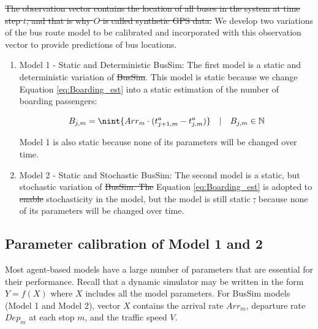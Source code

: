 \documentclass[11pt]{article}
\DeclarePairedDelimiter{\nint}\lfloor\rceil
\providecommand{\DIFaddtex}[1]{{\protect\color{blue}\uwave{#1}}} %
\providecommand{\DIFdeltex}[1]{{\protect\color{red}\sout{#1}}}                      %
\providecommand{\DIFaddbegin}{} %
\providecommand{\DIFaddend}{} %
\providecommand{\DIFdelbegin}{} %
\providecommand{\DIFdelend}{} %
\providecommand{\DIFadd}[1]{\texorpdfstring{\DIFaddtex{#1}}{#1}} %
\providecommand{\DIFdel}[1]{\texorpdfstring{\DIFdeltex{#1}}{}} %
\newcommand{\DIFscaledelfig}{0.5}
\newlength{\DIFdelgraphicswidth} %
\newlength{\DIFdelgraphicsheight} %
\newcommand{\DIFaddincludegraphics}[2][]{{\color{blue}\fbox{\DIFOincludegraphics[#1]{#2}}}} %
\newcommand{\DIFdelincludegraphics}[2][]{%
\sbox{\DIFdelgraphicsbox}{\DIFOincludegraphics[#1]{#2}}%
\settoboxwidth{\DIFdelgraphicswidth}{\DIFdelgraphicsbox} %
\settoboxtotalheight{\DIFdelgraphicsheight}{\DIFdelgraphicsbox} %
\scalebox{\DIFscaledelfig}{%
\parbox[b]{\DIFdelgraphicswidth}{\usebox{\DIFdelgraphicsbox}\\[-\baselineskip] \rule{\DIFdelgraphicswidth}{0em}}\llap{\resizebox{\DIFdelgraphicswidth}{\DIFdelgraphicsheight}{%
\setlength{\unitlength}{\DIFdelgraphicswidth}%
\begin{picture}(1,1)%
\thicklines\linethickness{2pt} %
{\color[rgb]{1,0,0}\put(0,0){\framebox(1,1){}}}%
{\color[rgb]{1,0,0}\put(0,0){\line( 1,1){1}}}%
{\color[rgb]{1,0,0}\put(0,1){\line(1,-1){1}}}%
\end{picture}%
}\hspace*{3pt}}} %
} %
\DeclareRobustCommand{\DIFaddbegin}{\DIFOaddbegin \let\includegraphics\DIFaddincludegraphics} %
\DeclareRobustCommand{\DIFaddend}{\DIFOaddend \let\includegraphics\DIFOincludegraphics} %
\DeclareRobustCommand{\DIFdelbegin}{\DIFOdelbegin \let\includegraphics\DIFdelincludegraphics} %
\DeclareRobustCommand{\DIFdelend}{\DIFOaddend \let\includegraphics\DIFOincludegraphics} %
\begin{document}
\DIFdelbegin \DIFdel{The observation vector contains the location of all buses in the system at time step $t$, and that is why $O$ is called synthetic GPS data. }\DIFdelend We develop two variations of the bus route model to be calibrated and incorporated with this observation vector to provide predictions of bus locations. 

\begin{enumerate}
    \item Model 1 - Static and Deterministic BusSim: The first model is a static and deterministic variation of \DIFdelbegin \DIFdel{BusSim}\DIFdelend \DIFaddbegin \DIFadd{BusSim-truth}\DIFaddend . This model is static because we change Equation \ref{eq:Boarding_est} into a static estimation of the number of boarding passengers: 
        \DIFdelbegin %

\DIFdelend \begin{equation}
        B_{j,m} = \nint{Arr_m \cdot (t^a_{j+1,m}-t^a_{j,m}) } \quad | \quad B_{j,m}\in\mathbb{N}
        \label{eq:Boarding_est_static}
        \end{equation}
    \DIFdelbegin %

\DIFdelend Model 1 is also static because none of its parameters will be changed over time. 

    \item Model 2 - Static and Stochastic BusSim: The second model is a static, but stochastic variation of \DIFdelbegin \DIFdel{BusSim. The }\DIFdelend \DIFaddbegin \DIFadd{BusSim-truth. }\DIFaddend Equation \ref{eq:Boarding_est} is adopted to \DIFdelbegin \DIFdel{enable }\DIFdelend \DIFaddbegin \DIFadd{allow }\DIFaddend stochasticity in the model, but the model is still static \DIFdelbegin \DIFdel{, }\DIFdelend because none of its parameters will be changed over time. 

\end{enumerate}


\subsection{Parameter calibration of Model 1 and 2}
\label{s:calibration}

Most agent-based models have a large number of parameters that are essential for their performance. Recall that a dynamic simulator may be written in the form $Y = f(X)$ where $X$ includes all the model parameters. For BusSim models (Model 1 and Model 2), vector $X$ contains the arrival rate $Arr_m$, departure rate $Dep_m$ at each stop $m$, and the traffic speed $V$. 
\DIFdelbegin %
\end{document}
